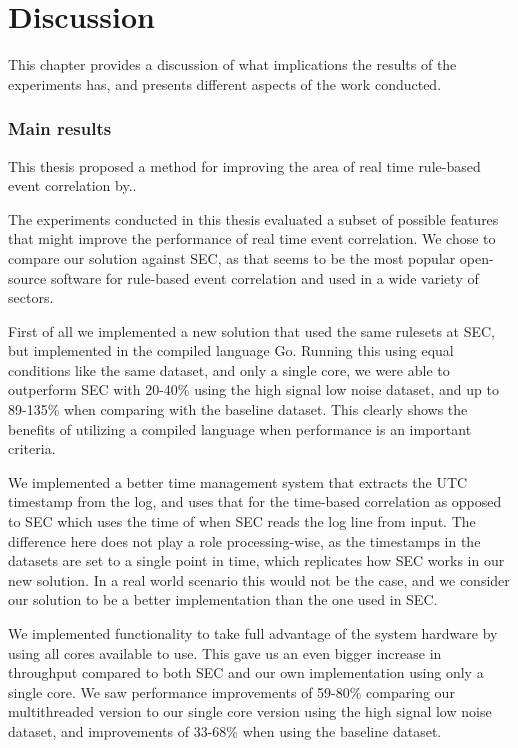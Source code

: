 \chapter{Discussion}
\label{chap:discussion}
This chapter provides a discussion of what implications the results of the experiments has, and presents different aspects of the work conducted.

\iffalse
Interpretations: what do the results mean?
Implications: why do the results matter?
Limitations: what can’t the results tell us?
Recommendations: what practical actions or scientific studies should follow?
\fi

\subsection{Main results}

This thesis proposed a method for improving the area of real time rule-based event correlation by..

The experiments conducted in this thesis evaluated a subset of possible features that might improve the performance of real time event correlation.
We chose to compare our solution against SEC, as that seems to be the most popular open-source software for rule-based event correlation and used in a wide variety of sectors. 

First of all we implemented a new solution that used the same rulesets at SEC, but implemented in the compiled language Go. Running this using equal conditions like the same dataset, and only a single core, we were able to outperform SEC with 20-40\% using the high signal low noise dataset, and up to 89-135\% when comparing with the baseline dataset. This clearly shows the benefits of utilizing a compiled language when performance is an important criteria.

We implemented a better time management system that extracts the UTC timestamp from the log, and uses that for the time-based correlation as opposed to SEC which uses the time of when SEC reads the log line from input. The difference here does not play a role processing-wise, as the timestamps in the datasets are set to a single point in time, which replicates how SEC works in our new solution. In a real world scenario this would not be the case, and we consider our solution to be a better implementation than the one used in SEC.

We implemented functionality to take full advantage of the system hardware by using all cores available to use. This gave us an even bigger increase in throughput compared to both SEC and our own implementation using only a single core. We saw performance improvements of 59-80\% comparing our multithreaded version to our single core version using the high signal low noise dataset, and improvements of 33-68\% when using the baseline dataset.

